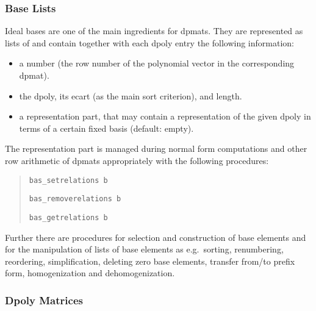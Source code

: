 \subsubsection{Base Lists}

Ideal bases are one of the main ingredients for dpmats. They are
represented as lists of  and contain together with
each dpoly entry the following information:
\begin{itemize}
\item a number (the row number of the polynomial vector in the
corresponding dpmat).

\item the dpoly, its ecart (as the main sort criterion), and length. 

\item a representation part, that may contain a representation of the
given dpoly in terms of a certain fixed basis (default: empty).
\end{itemize}

The representation part is managed during normal form computations
and other row arithmetic of dpmats appropriately with the following
procedures: 
\begin{quote}
\verb|bas_setrelations b| 


\verb|bas_removerelations b| 


\verb|bas_getrelations b| 

\end{quote}

Further there are procedures for selection and construction of base
elements and for the manipulation of lists of base elements as e.g.\
sorting, renumbering, reordering, simplification, deleting zero base
elements, transfer from/to prefix form, homogenization and dehomogenization. 

\subsubsection{Dpoly Matrices}

